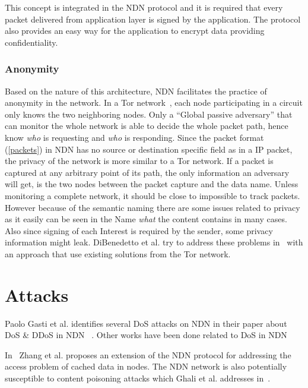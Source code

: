 This concept is integrated in the \gls{NDN} protocol and it is required that every packet delivered from application layer is signed by the application.
The protocol also provides an easy way for the application to encrypt data providing confidentiality.

\subsubsection{Anonymity}
Based on the nature of this architecture, \gls{NDN} facilitates the practice of anonymity in the network. 
In a Tor network~\cite{DBLP:conf/uss/DingledineMS04}, each node participating in a circuit only knows the two neighboring nodes.
Only a ``Global passive adversary'' that can monitor the whole network is able to decide the whole packet path, hence know \textit{who} is requesting and \textit{who} is responding.
Since the packet format (\autoref{packets}) in \gls{NDN} has no source or destination specific field as in a \gls{IP} packet, the privacy of the network is more similar to a Tor network.
If a packet is captured at any arbitrary point of its path, the only information an adversary will get, is the two nodes between the packet capture and the data name. 
Unless monitoring a complete network, it should be close to impossible to track packets.  
However because of the semantic naming there are some issues related to privacy as it easily can be seen in the Name \textit{what} the content contains in many cases.
Also since signing of each Interest is required by the sender, some privacy information might leak.
DiBenedetto et al. try to address these problems in~\cite{DBLP:conf/ndss/DiBenedettoGTU12} with an approach that use existing solutions from the Tor network.


\section{Attacks}

Paolo Gasti et al. identifies several \gls{DoS} attacks on \gls{NDN} in their paper about \gls{DoS} \& \gls{DDoS} in \gls{NDN} ~\cite{DBLP:conf/icccn/GastiTU013}. Other works have been done related to \gls{DoS} in \gls{NDN}~\cite{DBLP:journals/ijcomsys/WangCZQZ14, DBLP:conf/ancs/SoNO13, DBLP:journals/corr/abs-1303-4823}

In~\cite{DBLP:journals/tifs/LiZZSF15} Zhang et al. proposes an extension of the \gls{NDN} protocol for addressing the access problem of cached data in nodes.  
The \gls{NDN} network is also potentially susceptible to content poisoning attacks which Ghali et al. addresses in~\cite{DBLP:journals/ccr/GhaliTU14}.

